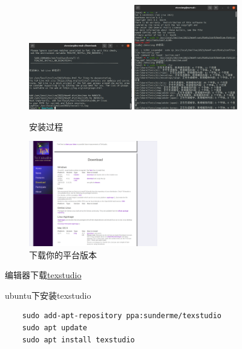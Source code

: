 \documentclass[11pt]{ctexart}
\begin{document}
\begin{figure}[ht]
	\centering
	\includegraphics[width=0.4\textwidth]{images/installing_1.png}
	\qquad
	\includegraphics[width=0.4\textwidth]{images/installing_2.png}
	\caption{安装过程}
	\label{fig:install}
\end{figure}



\newpage

\begin{figure}[ht]
	\centering
	\includegraphics[width=0.5\textwidth]{images/texstudio.png}
	\caption{下载你的平台版本}
	\label{fig:texstudio}
\end{figure}

编辑器下载\href{https://www.texstudio.org/}{texstudio}



ubuntu下安装texstudio

\begin{lstlisting}
	sudo add-apt-repository ppa:sunderme/texstudio
	sudo apt update
	sudo apt install texstudio
\end{lstlisting}
\end{document}
